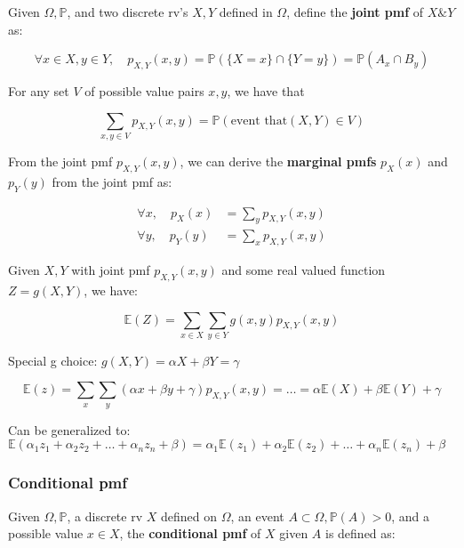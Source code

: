 \documentclass{article}
\begin{document}
Given $\Omega, \mathbb{P}$, and two discrete rv's $X, Y$ defined in
$\Omega$, define the \textbf{joint pmf} of $X \& Y$ as:

\begin{equation}
  \tag{Joint pmf}
  \boxed{
    \forall x \in X, y \in Y, \quad p_{X,Y} (x,y) = \mathbb{P}(\{X=x\} \cap
    \{Y=y\}) = \mathbb{P}(A_x \cap B_y)
  }
\end{equation}

For any set $V$ of possible value pairs $x,y$, we have that

\[
  \sum_{x,y \in V} p_{X,Y} (x,y) = \mathbb{P}(\text{event that} (X,Y)
  \in V)
\]

From the joint pmf $p_{X,Y}(x,y)$, we can derive the \textbf{marginal
  pmfs} $p_X(x)$ and $p_Y(y)$ from the joint pmf as:

\begin{equation}
  \tag{Marginal Pmfs}
  \boxed{
    \begin{split}
      \forall x, \quad p_X(x) &= \sum_y p_{X,Y}(x,y) \\
      \forall y, \quad p_Y(y) &= \sum_x p_{X,Y}(x,y) 
    \end{split}
  }
\end{equation}

Given $X,Y$ with joint pmf $p_{X,Y}(x,y)$ and some real valued
function $Z=g(X,Y)$, we have:

\begin{equation}
  \tag{Joint Expected Value Rule}
  \boxed{
    \mathbb{E}(Z) = \sum_{x\in X} \sum_{y\in Y} g(x,y) p_{X,Y} (x,y)
  }
\end{equation}

Special g choice: $g(X,Y) = \alpha X + \beta Y = \gamma$

\[
  \mathbb{E}(z) = \sum_x \sum _y (\alpha x + \beta y + \gamma) p_{X,Y}
  (x,y) = \dots = \alpha\mathbb{E}(X) + \beta\mathbb{E}(Y) + \gamma
\]

Can be generalized to: $\mathbb{E}(\alpha_1z_1 + \alpha_2z_2 + \dots +
\alpha_nz_n + \beta) = \alpha_1 \mathbb{E}(z_1) + \alpha_2
\mathbb{E}(z_2) + \dots + \alpha_n \mathbb{E}(z_n) + \beta$

\subsubsection{Conditional pmf}

Given $\Omega, \mathbb{P}$, a discrete rv $X$ defined on $\Omega$, an
event $A \subset \Omega, \mathbb{P}(A) > 0$, and a possible value
$x \in X$, the \textbf{conditional pmf} of $X$ given $A$ is defined
as:
\end{document}
